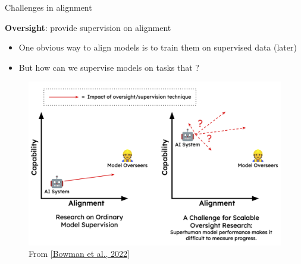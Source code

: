 \documentclass[usenames,dvipsnames,notes,11pt,aspectratio=169,hyperref={colorlinks=true, linkcolor=blue}]{beamer}
\begin{document}
\begin{frame}
    {Challenges in alignment}

    \textbf{Oversight}: provide supervision on alignment\\
    \begin{itemize}
        \item One obvious way to align models is to train them on supervised data (later)
        \item But how can we supervise models on tasks that ?
    \end{itemize}
    \vspace{-1em}

    \begin{figure}
        \includegraphics[height=0.6\textheight]{figures/oversight}
        \caption{From \href{https://arxiv.org/pdf/2211.03540.pdf}{[Bowman et al., 2022]}}
    \end{figure}
\end{frame}
\end{document}
